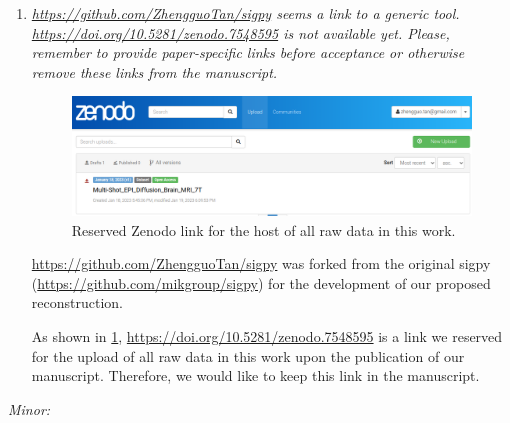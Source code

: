 \documentclass[a4paper,11pt,twoside]{report}
\begin{document}
\begin{enumerate}
    \item \textit{\url{https://github.com/ZhengguoTan/sigpy} seems a link to a generic tool. \url{https://doi.org/10.5281/zenodo.7548595} is not available yet. Please, remember to provide paper-specific links before acceptance or otherwise remove these links from the manuscript.}

    \begin{figure}
        \centering
        \includegraphics[width=\textwidth]{fig_zenodo.png}
        \caption{Reserved Zenodo link for the host of all raw data in this work.}
        \label{FIG:Zenodo}
    \end{figure}

    \hspace{1em} \url{https://github.com/ZhengguoTan/sigpy} was forked
    from the original sigpy (\url{https://github.com/mikgroup/sigpy})
    for the development of our proposed reconstruction.

    \hspace{1em} As shown in \cref{FIG:Zenodo},
    \url{https://doi.org/10.5281/zenodo.7548595} is a link we reserved
    for the upload of all raw data in this work
    upon the publication of our manuscript.
    Therefore, we would like to keep this link in the manuscript.

\end{enumerate}


\noindent \textit{Minor:}
\end{document}
